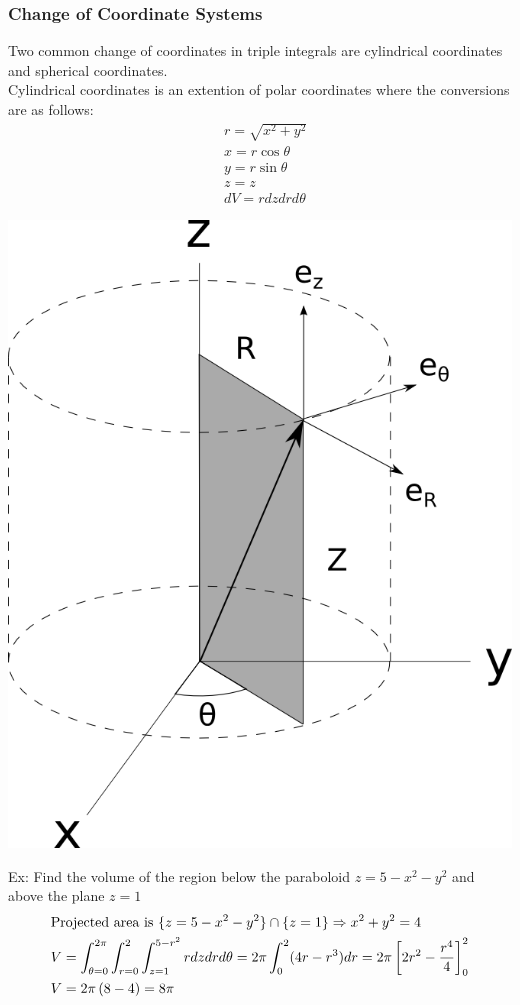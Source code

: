 \documentclass[11pt, fleqn]{article}
\begin{document}
\subsubsection{Change of Coordinate Systems}
Two common change of coordinates in triple integrals are cylindrical coordinates and spherical coordinates.\\
Cylindrical coordinates is an extention of polar coordinates where the conversions are as follows:
\begin{align*}
    &r=\sqrt{x^2+y^2}\\
    &x=r\cos\theta\\
    &y=r\sin\theta\\
    &z=z\\
    &dV=rdzdrd\theta
\end{align*}
\centerline{\includegraphics[scale=0.3]{Math217Pictures/cylindricalCoordinates.png}}
Ex: Find the volume of the region below the paraboloid $z=5-x^2-y^2$ and above the plane $z=1$
\begin{align*}
    &\text{Projected area is }\{z=5-x^2-y^2\}\cap\{z=1\}\Rightarrow x^2+y^2=4\\
    &V=\int_{\theta=0}^{2\pi}\int_{r=0}^2\int_{z=1}^{5-r^2}rdzdrd\theta=2\pi\int_0^2 (4r-r^3)dr=2\pi\left[ 2r^2-\frac{r^4}{4} \right]_0^2\\
    &V=2\pi\left( 8-4 \right)=8\pi
\end{align*}
\end{document}
